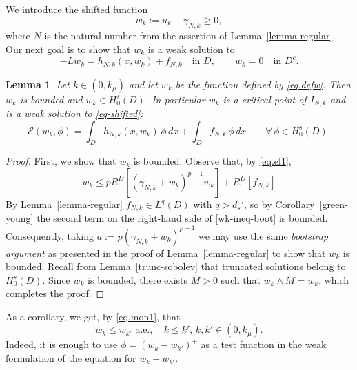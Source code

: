 \documentclass[11pt,a4paper,reqno]{amsart}
\newtheorem{lemma}[theorem]{\bf Lemma}
\theoremstyle{definition}
\numberwithin{equation}{section}
\begin{document}
We introduce the shifted function
\begin{equation}
\label{eq.defw}
w_{k}:=u_{k}-\gamma_{N,k}\geq0,
\end{equation}
where $N$ is the natural number from the assertion of Lemma~\ref{lemma-regular}.
Our next goal is to show that $w_k$ is a weak solution to 
\begin{equation}
\label{eq-shifted}
-Lw_{k}=h_{N,k}(x,w_{k})+f_{N,k}\quad\text{in }D,\qquad w_k=0\quad \text{in }D^c.
\end{equation}



 
\begin{lemma}\label{lemma-H0s}
Let   $k\in(0,k_\mu)$ and let $w_k$ be the function defined by \eqref{eq.defw}.
Then $w_k$ is bounded and $w_{k}\in H_{0}^{s}(D)$. In particular $w_{k}$ is a critical point of $I_{N,k}$ and is a weak solution to \eqref{eq-shifted}:
\begin{equation}
\label{weak-shifted}
    \mathcal{E}(w_{k},\phi)=\int_{D}h_{N,k}(x,w_{k})\,\phi\,dx
                            +\int_{D}f_{N,k}\,\phi\,dx
    \qquad\forall\,\phi\in H_{0}^{s}(D).
  \end{equation}
\end{lemma}
 
\begin{proof}
First, we show that $w_k$ is bounded.
Observe that, by \eqref{eq.el1},
\begin{equation}\label{wk-ineq-boot}
w_k\le pR^{D}[(\gamma_{N,k}+w_k)^{p-1}w_k]+R^{D}[f_{N,k}]
\end{equation}
By Lemma~\ref{lemma-regular} $f_{N,k}\in L^{q}(D)$ with $q>d_s'$, so by Corollary~\ref{green-young} the second term on the right-hand side of \eqref{wk-ineq-boot} is bounded. 
Consequently, taking $a:=p(\gamma_{N,k}+w_k)^{p-1}$ we may use the same {\em bootstrap argument} 
as presented in the proof of Lemma~\ref{lemma-regular} to show that $w_k$ is bounded. 
Recall from Lemma~\ref{trunc-sobolev} that truncated solutions belong to 
$H_{0}^{s}(D)$. Since $w_k$ is bounded, there exists $M>0$ such that $w_k\wedge M=w_k$, which completes the proof.

\end{proof}

As a corollary, we get, by \eqref{eq.mon1}, that 
\begin{equation}
\label{eq.compw1}
w_{k}\le w_{k'}\text{ a.e.},\quad k\le k',\, k,k'\in (0,k_\mu).
\end{equation}
Indeed, it is enough to use $\phi=(w_k-w_{k'})^+$ as a test function in the weak formulation of the equation for $w_k-w_{k'}$.
\end{document}
